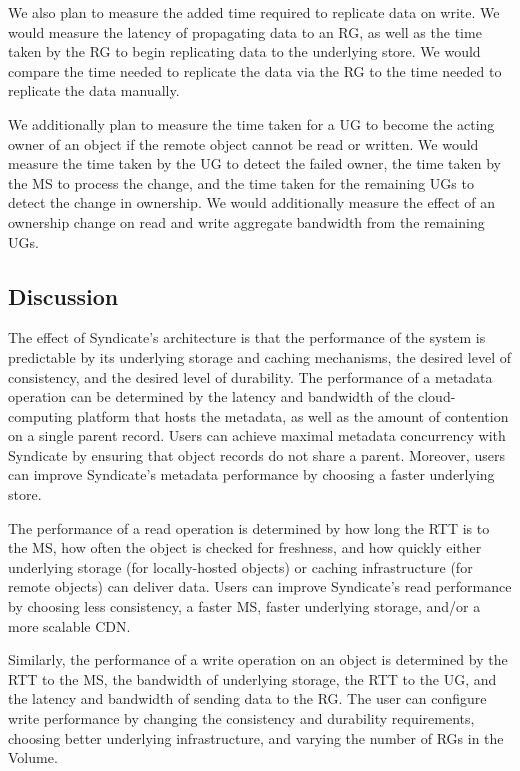 We also plan to measure the added time required to replicate data on write.  We would measure the latency of propagating data to an RG, as well as the time taken by the RG to begin replicating data to the underlying store.  We would compare the time needed to replicate the data via the RG to the time needed to replicate the data manually.

We additionally plan to measure the time taken for a UG to become the acting owner of an object if the remote object cannot be read or written.  We would measure the time taken by the UG to detect the failed owner, the time taken by the MS to process the change, and the time taken for the remaining UGs to detect the change in ownership.  We would additionally measure the effect of an ownership change on read and write aggregate bandwidth from the remaining UGs.

\subsection{Discussion}

The effect of Syndicate's architecture is that the performance of the system is predictable by its underlying storage and caching mechanisms, the desired level of consistency, and the desired level of durability.  The performance of a metadata operation can be determined by the latency and bandwidth of the cloud-computing platform that hosts the metadata, as well as the amount of contention on a single parent record.  Users can achieve maximal metadata concurrency with Syndicate by ensuring that object records do not share a parent.  Moreover, users can improve Syndicate's metadata performance by choosing a faster underlying store.

The performance of a read operation is determined by how long the RTT is to the MS, how often the object is checked for freshness, and how quickly either underlying storage (for locally-hosted objects) or caching infrastructure (for remote objects) can deliver data.  Users can improve Syndicate's read performance by choosing less consistency, a faster MS, faster underlying storage, and/or a more scalable CDN.

Similarly, the performance of a write operation on an object is determined by the RTT to the MS, the bandwidth of underlying storage, the RTT to the UG, and the latency and bandwidth of sending data to the RG.  The user can configure write performance by changing the consistency and durability requirements, choosing better underlying infrastructure, and varying the number of RGs in the Volume.

